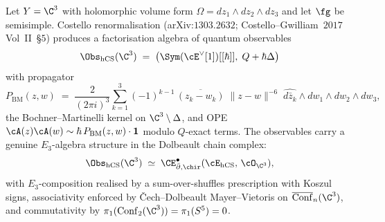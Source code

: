 \begin{theorem}
\label{thm:plat-hCS-quantum}
Let $Y = \C^3$ with holomorphic volume form $\Omega = dz_1 \wedge dz_2 \wedge dz_3$ and let $\fg$ be semisimple.
Costello renormalisation (arXiv:$1303.2632$; Costello--Gwilliam~$2017$ Vol~II~\S$5$)
produces a factorisation algebra of quantum observables
\[
 \Obs_{\hCS}(\C^3)
 \;=\; \bigl(\Sym(\cE^\vee[1])[[\hbar]],\; Q + \hbar\Delta\bigr)
\]
with propagator
\[
 P_{\mathrm{BM}}(z,w)
 \;=\; \frac{2}{(2\pi i)^3}
 \sum_{k=1}^{3} (-1)^{k-1}\, \overline{(z_k - w_k)}\; \|z - w\|^{-6}\;
 \widehat{d\bar{z}_k} \wedge dw_1 \wedge dw_2 \wedge dw_3,
\]
the Bochner--Martinelli kernel on $\C^3 \setminus \Delta$, and OPE
$\cA(z)\cA(w) \sim \hbar\, P_{\mathrm{BM}}(z,w) \cdot \mathbf{1}$
modulo $Q$-exact terms. The observables carry a genuine
$E_3$-algebra structure in the Dolbeault chain complex:
\[
 \Obs_{\hCS}(\C^3)
 \;\simeq\;
 \CE^\bullet_{\bar\partial,\chir}(\cE_{\hCS},\,\cO_{\C^3}),
\]
with $E_3$-composition realised by a sum-over-shuffles prescription with
Koszul signs, associativity enforced by \v{C}ech--Dolbeault Mayer--Vietoris
on $\overline{\mathrm{Conf}}_n(\C^3)$, and commutativity by
$\pi_1(\mathrm{Conf}_2(\C^3)) = \pi_1(S^5) = 0$.
\end{theorem}


